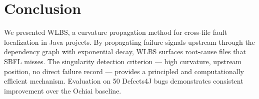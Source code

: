 \documentclass[acmtog]{acmart}
\begin{document}
\section{Conclusion}\label{sec:conclusion}

We presented WLBS, a curvature propagation method for cross-file fault
localization in Java projects. By propagating failure signals upstream
through the dependency graph with exponential decay, WLBS surfaces
root-cause files that SBFL misses. The singularity detection criterion
— high curvature, upstream position, no direct failure record — provides
a principled and computationally efficient mechanism. Evaluation on 50
Defects4J bugs demonstrates consistent improvement over the Ochiai baseline.



\end{document}
